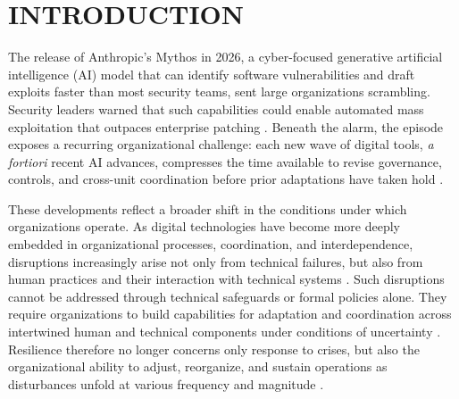 \section{INTRODUCTION}
\label{sec:Introduction}
\renewcommand{\baselinestretch}{2.0}\normalsize

The release of Anthropic's Mythos in 2026, a cyber-focused generative artificial intelligence (AI) model that can identify software vulnerabilities and draft exploits faster than most security teams, sent large organizations scrambling. Security leaders warned that such capabilities could enable automated mass exploitation that outpaces enterprise patching \autocite{smith2026mythos}. Beneath the alarm, the episode exposes a recurring organizational challenge: each new wave of digital tools, {\it a fortiori} recent AI advances, compresses the time available to revise governance, controls, and cross-unit coordination before prior adaptations have taken hold \autocite{paries2017resilience}.

These developments reflect a broader shift in the conditions under which organizations operate. As digital technologies have become more deeply embedded in organizational processes, coordination, and interdependence, disruptions increasingly arise not only from technical failures, but also from human practices and their interaction with technical systems \autocite{dupont2019cyberresilience}. Such disruptions cannot be addressed through technical safeguards or formal policies alone. They require organizations to build capabilities for adaptation and coordination across intertwined human and technical components under conditions of uncertainty \autocite{boin2013resilient}. Resilience therefore no longer concerns only response to crises, but also the organizational ability to adjust, reorganize, and sustain operations as disturbances unfold at various frequency and magnitude \autocite{burnard2011organisational}.

